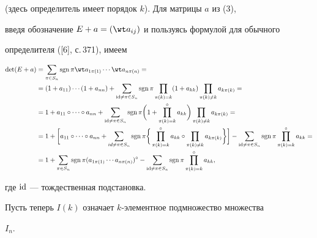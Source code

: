 (здесь определитель имеет порядок $k$). Для матрицы $a$ из (3), 


введя обозначение $E+a=(\wt a_{ij})$ и пользуясь формулой для обычного 


определителя ([6], с.\,371), имеем 


\begin{align*} 


\Det(E+a)&=\sum_{\pi\in S_n}\sgn\pi\wt a_{1\pi(1)}\dotsb 


\wt a_{n\pi(n)}=\\ 


% 


&=(1+a_{11})\dotsb(1+a_{nn})+\sum_{\id\ne\pi\in S_n} 


\sgn\pi\prod_{\pi(k)=k}(1+a_{kk})


\prod_{\pi(k)\ne k}a_{k\pi(k)}= \\ 


% 


&=1+a_{11}\circ\dotsb\circ a_{nn}+ 


\sum_{\id\ne\pi\in S_n}\sgn\pi\bigg( 


1+\prod^\circ_{\pi(k)=k}a_{kk}\bigg)


\prod_{\pi(k)\ne k}a_{k\pi(k)}= \\ 


% 


&=1+\bigg[a_{11}\circ\dotsb\circ a_{nn}+ 


\sum_{id\ne\pi\in S_n}\sgn\pi\bigg\{ 


\prod^\circ_{\pi(k)=k}a_{kk}\circ 


\prod_{\pi(k)\ne k}a_{k\pi(k)}\bigg\}\bigg]- 


\sum_{\id\ne\pi\in S_n}\sgn\pi 


\prod^\circ_{\pi(k)=k}a_{kk} =\\ 


% 


&=1+\sum_{\pi\in S_n}\sgn\pi(a_{1\pi(1)}\dotsb a_{n\pi(n)})^\circ- 


\sum_{\id\ne\pi\in S_n}\sgn\pi\prod^\circ_{\pi(k)=k} 


a_{kk}, 


\end{align*} 


где $\operatorname{id}$ --- тождественная подстановка. 


 


Пусть теперь $I(k)$ означает $k$-элементное подмножество множества 


$I_n$. 


